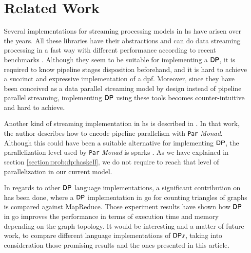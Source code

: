 \section{Related Work}\label{section:related-work}
Several implementations for streaming processing models \cite{conduit, pipes, streamly} in \acrshort{hs} have arisen over the years. All these libraries have their abstractions and can do data streaming processing in a fast way with different performance according to recent benchmarks \cite{benchstreamhs}. Although they seem to be suitable for implementing a $\mathsf{DP}$, it is required to know pipeline stages disposition beforehand, and it is hard to achieve a succinct and expressive implementation of a \acrshort{dpf}. Moreover, since they have been conceived as a data parallel streaming model \cite{hr19} by design instead of pipeline parallel streaming, implementing $\mathsf{DP}$ using these tools becomes counter-intuitive and hard to achieve.

Another kind of streaming implementation in \acrshort{hs} is described in \cite{parallelbook}. In that work, the author describes how to encode pipeline parallelism with \texttt{Par} \textit{Monad}. Although this could have been a suitable alternative for implementing $\mathsf{DP}$, the parallelization level used by \texttt{Par} \textit{Monad} is sparks \cite{sparks}. As we have explained in section \autoref{section:prob:dp:haskell}, we do not require to reach that level of parallelization in our current model.

In regards to other $\mathsf{DP}$ language implementations, a significant contribution on \cite{dpp_triangles} has been done, where a $\mathsf{DP}$ implementation in \acrfull{go} for counting triangles of graphs is compared against MapReduce. Those experiment results have shown how $\mathsf{DP}$ in \acrshort{go} improves the performance in terms of execution time and memory depending on the graph topology. It would be interesting and a matter of future work, to compare different language implementations of $\mathsf{DP} s$, taking into consideration those promising results and the ones presented in this article.

\iffalse
In particular, the problem presented in \autoref{sub:sec:mot:ex} is one of the algorithms in which the amount of stages that could run in parallel is the worst case having one Stage per edge at most, but still in that scenario the number of threads can be efficiently handled by \acrshort{ghc}. Therefore, there is no need for such a fine grained parallelization level as it could be required when the data should be split into the smallest processing units as possible. 
\fi
